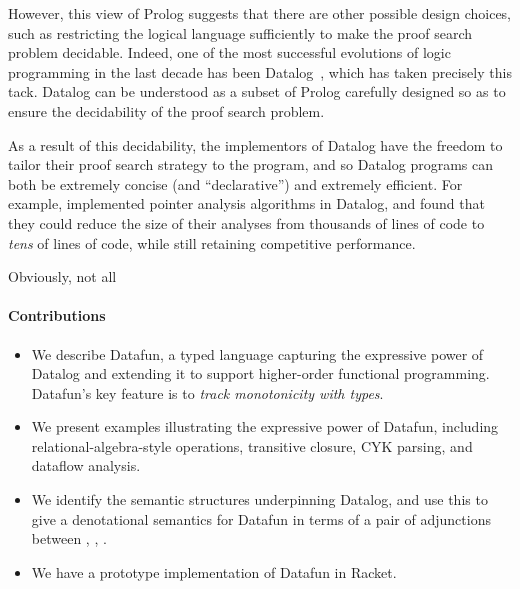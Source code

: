 However, this view of Prolog suggests that there are other possible
design choices, such as restricting the logical language sufficiently
to make the proof search problem decidable. Indeed, one of the most
successful evolutions of logic programming in the last decade has been
Datalog~\cite{datalog}, which has taken precisely this tack. Datalog
can be understood as a subset of Prolog carefully designed so as to
ensure the decidability of the proof search problem.



As a result of this decidability, the implementors of Datalog have the
freedom to tailor their proof search strategy to the program, and so
Datalog programs can both be extremely concise (and ``declarative'')
and extremely efficient. For example, \citet{whaley-lam} implemented
pointer analysis algorithms in Datalog, and found that they could
reduce the size of their analyses from thousands of lines of code to
\emph{tens} of lines of code, while still retaining competitive
performance.

Obviously, not all 











\paragraph{Contributions}
\begin{itemize}
\item We describe Datafun, a typed language capturing the expressive power of
  Datalog and extending it to support higher-order functional programming.
  Datafun's key feature is to \emph{track monotonicity with types}.

\item We present examples illustrating the expressive power of Datafun,
  including relational-algebra-style operations, transitive closure, CYK
  parsing, and dataflow analysis.

\item We identify the semantic structures underpinning Datalog, and use this to
  give a denotational semantics for Datafun in terms of a pair of adjunctions
  between \cSet{}, \cPoset{}, \cSL{}.

\item We have a prototype implementation of Datafun in Racket. 
\end{itemize}

